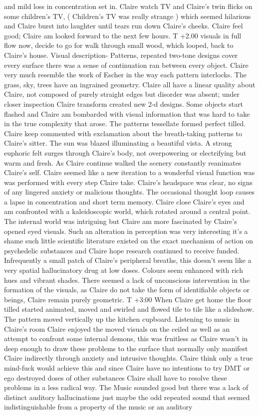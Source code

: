 \documentclass[12pt]{book}
\begin{document}
and mild loss in concentration set in. Claire watch TV and Claire's twin flicks on some children's TV, ( Children's TV was really strange ) which seemed hilarious and Claire burst into laughter until tears run down Claire's cheeks. Claire feel good; Claire am looked forward to the next few hours. T +2.00 visuals in full flow now, decide to go for walk through small wood, which looped, back to Claire's house. Visual description- Patterns, repeated two-tone designs cover every surface there was a sense of continuation ran between every object. Claire very much resemble the work of Escher in the way each pattern interlocks. The grass, sky, trees have an ingrained geometry. Claire all have a linear quality about Claire, not composed of purely straight edges but disorder was absent; under closer inspection Claire transform created new 2-d designs. Some objects start flashed and Claire am bombarded with visual information that was hard to take in the true complexity that arose. The patterns tessellate formed perfect tilled. Claire keep commented with exclamation about the breath-taking patterns to Claire's sitter. The sun was blazed illuminating a beautiful vista. A strong euphoric felt surges through Claire's body, not overpowering or electrifying but warm and fresh. As Claire continue walked the scenery constantly reanimates Claire's self. Claire seemed like a new iteration to a wonderful visual function was was performed with every step Claire take. Claire's headspace was clear, no signs of any lingered anxiety or malicious thoughts. The occasional thought loop causes a lapse in concentration and short term memory. Claire close Claire's eyes and am confronted with a kaleidoscopic world, which rotated around a central point. The internal world was intriguing but Claire am more fascinated by Claire's opened eyed visuals. Such an alteration in perception was very interesting it's a shame such little scientific literature existed on the exact mechanism of action on psychedelic substances and Claire hope research continued to receive funded. Infrequently a small patch of Claire's peripheral breaths, this doesn't seem like a very spatial hallucinatory drug at low doses. Colours seem enhanced with rich hues and vibrant shades. There seemed a lack of unconscious intervention in the formation of the visuals, as Claire do not take the form of identifiable objects or beings, Claire remain purely geometric. T +3:00 When Claire get home the floor tilled started animated, moved and swirled and flowed tile to tile like a slideshow. The pattern moved vertically up the kitchen cupboard. Listening to music in Claire's room Claire enjoyed the moved visuals on the ceiled as well as an attempt to confront some internal demons, this was fruitless as Claire wasn't in deep enough to draw these problems to the surface that normally only manifest Claire indirectly through anxiety and intrusive thoughts. Claire think only a true mind-fuck would achieve this and since Claire have no intentions to try DMT or ego destroyed doses of other substances Claire shall have to resolve these problems in a less radical way. The Music sounded good but there was a lack of distinct auditory hallucinations just maybe the odd repeated sound that seemed indistinguishable from a property of the music or an auditory 
\end{document}
